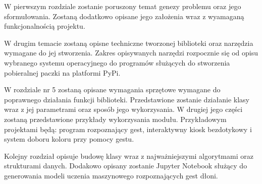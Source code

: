 \quad W pierwszym rozdziale zostanie poruszony temat genezy problemu oraz jego sformułowania. Zostaną dodatkowo opisane jego założenia wraz z wyamaganą funkcjonalnością projektu. 

\quad W drugim temacie zostaną opisne techniczne tworzonej biblioteki oraz narzędzia wymagane do jej stworzenia. Zakres opisywanych narzędzi rozpocznie się od opisu wybranego systemu operacyjnego do programów służących do stworzenia pobieralnej paczki na platformi PyPi.

\quad W rozdziale nr 5 zostaną opisane wymagania sprzętowe wymagane do poprawnego działania funkcji biblioteki. Przedstawione zostanie działanie klasy wraz z jej parametrami oraz sposób jego wykorzysania. W drugiej jego części zostaną przedstawione przykłady wykorzysania modułu. Przykładowym projektami będą: program rozpoznający gest, interaktywny kiosk bezdotykowy i system doboru koloru przy pomocy gestu. 

\quad Kolejny rozdział opisuje budowę klasy wraz z najważniejszymi algorytmami oraz strukturami danych. Dodakowo opisany zostanie Jupyter Notebook służący do generowania modeli uczenia maszynowego rozpoznających gest dłoni. 






